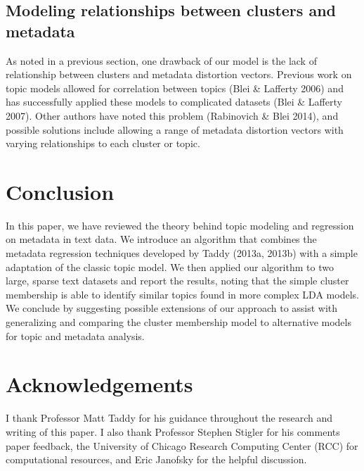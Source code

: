\documentclass[12pt]{article}
\begin{document}
\subsection{Modeling relationships between clusters and metadata}
As noted in a previous section, one drawback of our model is the lack of relationship between clusters and metadata distortion vectors. 
Previous work on topic models allowed for correlation between topics (Blei \& Lafferty 2006) and has successfully applied these models to complicated datasets (Blei \& Lafferty 2007).
Other authors have noted this problem (Rabinovich \& Blei 2014), and possible solutions include allowing a range of metadata distortion vectors with varying relationships to each cluster or topic. 


\section{Conclusion}\label{conclusion}

In this paper, we have reviewed the theory behind topic modeling and regression on metadata in text data. 
We introduce an algorithm that combines the metadata regression techniques developed by Taddy (2013a, 2013b) with a simple adaptation of the classic topic model.
We then applied our algorithm to two large, sparse text datasets and report the results, noting that the simple cluster membership is able to identify similar topics found in more complex LDA models. 
We conclude by suggesting possible extensions of our approach to assist with generalizing and comparing the cluster membership model to alternative models for topic and metadata analysis. 


\section{Acknowledgements}\label{conclusion}

I thank Professor Matt Taddy for his guidance throughout the research and writing of this paper. I also thank Professor Stephen Stigler for his comments paper feedback, the University of Chicago Research Computing Center (RCC) for computational resources, and Eric Janofsky for the helpful discussion. 


\newpage

\end{document}
